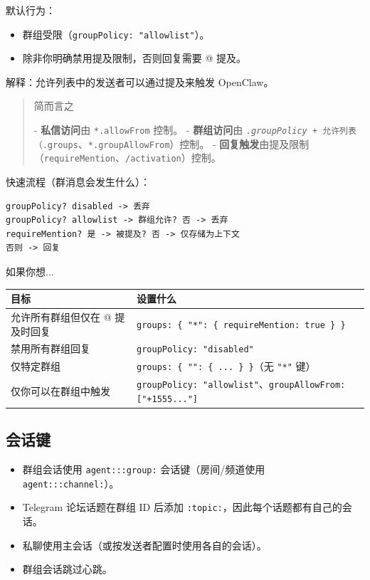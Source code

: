 默认行为：

\begin{itemize}
  \item 群组受限（\texttt{groupPolicy: "allowlist"}）。
  \item 除非你明确禁用提及限制，否则回复需要 @ 提及。
\end{itemize}


解释：允许列表中的发送者可以通过提及来触发 OpenClaw。

\begin{quote}
简而言之

- \textbf{私信访问}由 \texttt{*.allowFrom} 控制。
- \textbf{群组访问}由 \texttt{\textit{.groupPolicy} + 允许列表（\texttt{}.groups}、\texttt{*.groupAllowFrom}）控制。
- \textbf{回复触发}由提及限制（\texttt{requireMention}、\texttt{/activation}）控制。
\end{quote}


快速流程（群消息会发生什么）：

\begin{lstlisting}
groupPolicy? disabled -> 丢弃
groupPolicy? allowlist -> 群组允许? 否 -> 丢弃
requireMention? 是 -> 被提及? 否 -> 仅存储为上下文
否则 -> 回复
\end{lstlisting}



如果你想...

\begin{table}[h]
\centering
\small
\begin{tabular}{|l|l|}
\hline
目标 & 设置什么 \\
\hline
允许所有群组但仅在 @ 提及时回复 & \texttt{groups: \{ "*": \{ requireMention: true \} \}} \\
\hline
禁用所有群组回复 & \texttt{groupPolicy: "disabled"} \\
\hline
仅特定群组 & \texttt{groups: \{ "": \{ ... \} \}}（无 \texttt{"*"} 键） \\
\hline
仅你可以在群组中触发 & \texttt{groupPolicy: "allowlist"}、\texttt{groupAllowFrom: ["+1555..."]} \\
\hline
\end{tabular}
\end{table}



\subsection{会话键}


\begin{itemize}
  \item 群组会话使用 \texttt{agent:::group:} 会话键（房间/频道使用 \texttt{agent:::channel:}）。
  \item Telegram 论坛话题在群组 ID 后添加 \texttt{:topic:}，因此每个话题都有自己的会话。
  \item 私聊使用主会话（或按发送者配置时使用各自的会话）。
  \item 群组会话跳过心跳。
\end{itemize}


